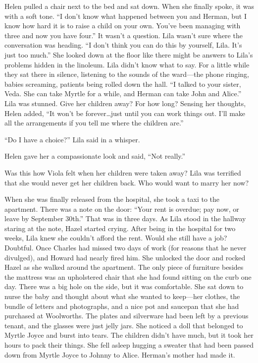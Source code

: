 \documentclass[
  letterpaper,
]{book}
\begin{document}
Helen pulled a chair next to the bed and sat down. When she finally
spoke, it was with a soft tone. ``I don't know what happened between you
and Herman, but I know how hard it is to raise a child on your own.
You've been managing with three and now you have four.'' It wasn't a
question. Lila wasn't sure where the conversation was heading. ``I don't
think you can do this by yourself, Lila. It's just too much.'' She
looked down at the floor like there might be answers to Lila's problems
hidden in the linoleum. Lila didn't know what to say. For a little while
they sat there in silence, listening to the sounds of the ward---the
phone ringing, babies screaming, patients being rolled down the hall.
``I talked to your sister, Veda. She can take Myrtle for a while, and
Herman can take John and Alice.'' Lila was stunned. Give her children
away? For how long? Sensing her thoughts, Helen added, ``It won't be
forever\ldots just until you can work things out. I'll make all the
arrangements if you tell me where the children are.''

``Do I have a choice?'' Lila said in a whisper.

Helen gave her a compassionate look and said, ``Not really.''

Was this how Viola felt when her children were taken away? Lila was
terrified that she would never get her children back. Who would want to
marry her now?

When she was finally released from the hospital, she took a taxi to the
apartment. There was a note on the door: ``Your rent is overdue; pay
now, or leave by September 30th.'' That was in three days. As Lila stood
in the hallway staring at the note, Hazel started crying. After being in
the hospital for two weeks, Lila knew she couldn't afford the rent.
Would she still have a job? Doubtful. Once Charles had missed two days
of work (for reasons that he never divulged), and Howard had nearly
fired him. She unlocked the door and rocked Hazel as she walked around
the apartment. The only piece of furniture besides the mattress was an
upholstered chair that she had found sitting on the curb one day. There
was a big hole on the side, but it was comfortable. She sat down to
nurse the baby and thought about what she wanted to keep---her clothes,
the bundle of letters and photographs, and a nice pot and saucepan that
she had purchased at Woolworths. The plates and silverware had been left
by a previous tenant, and the glasses were just jelly jars. She noticed
a doll that belonged to Myrtle Joyce and burst into tears. The children
didn't have much, but it took her hours to pack their things. She fell
asleep hugging a sweater that had been passed down from Myrtle Joyce to
Johnny to Alice. Herman's mother had made it.
\end{document}
